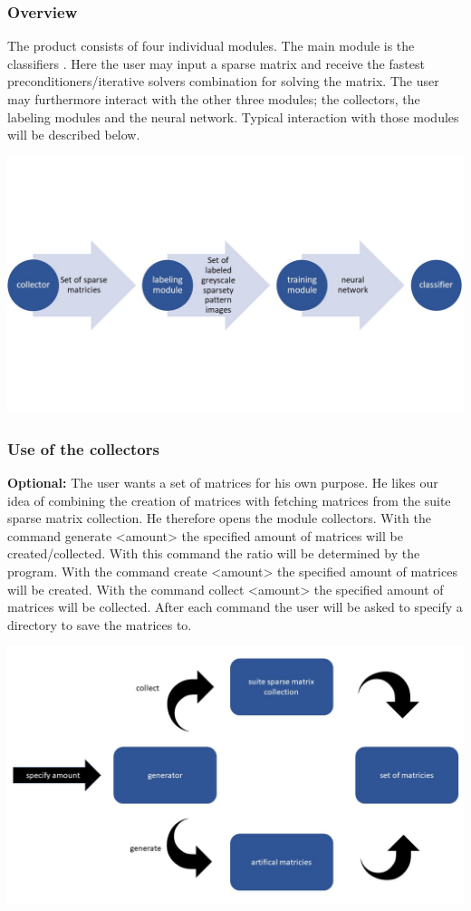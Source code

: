 \documentclass[parskip=full]{scrartcl}
\begin{document}
\subsubsection{Overview}
The product consists of four individual modules. The main module is the \glspl{classifier} . Here the user may input a sparse matrix and receive the fastest \glspl{preconditioner}/\glspl{iterative solver} combination for solving the matrix. The user may furthermore interact with the other three modules; the \glspl{collector}, the \glspl{labeling module} and the neural network.  Typical interaction with those modules will be described below.
\begin{center}
\includegraphics[width=\textwidth]{workflow}
\end{center}


\subsubsection{Use of the \glspl{collector}}
\textbf{Optional:} The user wants a set of matrices for his own purpose. He likes our idea of combining the creation of matrices with fetching matrices from the suite sparse matrix collection. He therefore opens the module \glspl{collector}. With the command generate <amount> the specified amount of matrices will be created/collected. With this command the ratio will be determined by the program. With the command create <amount> the specified amount of matrices will be created.  With the command collect <amount> the specified amount of matrices will be collected. After each command the user will be asked to specify a directory to save the matrices to.
\begin{center}
\includegraphics[width=\textwidth]{generator}
\end{center}
\end{document}

